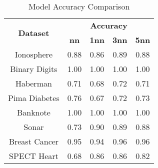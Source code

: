 \begin{table}[htbp]
\caption{Model Accuracy Comparison}
\begin{center}
\begin{tabular}{|c|c|c|c|c|}
\hline
\multirow{2}{*}{\textbf{Dataset}} & \multicolumn{4}{c|}{\textbf{Accuracy}} \\ \cline{2-5}
 & \textbf{nn} & \textbf{1nn} & \textbf{3nn} & \textbf{5nn} \\ \hline
Ionosphere & 0.88 & 0.86 & 0.89 & 0.88 \\ \hline
Binary Digits & 1.00 & 1.00 & 1.00 & 1.00 \\ \hline
Haberman & 0.71 & 0.68 & 0.72 & 0.71 \\ \hline
Pima Diabetes & 0.76 & 0.67 & 0.72 & 0.73 \\ \hline
Banknote & 1.00 & 1.00 & 1.00 & 1.00 \\ \hline
Sonar & 0.73 & 0.90 & 0.89 & 0.88 \\ \hline
Breast Cancer & 0.95 & 0.94 & 0.96 & 0.96 \\ \hline
SPECT Heart & 0.68 & 0.86 & 0.86 & 0.82 \\ \hline
\end{tabular}
\label{tab:accuracy}
\end{center}
\end{table}